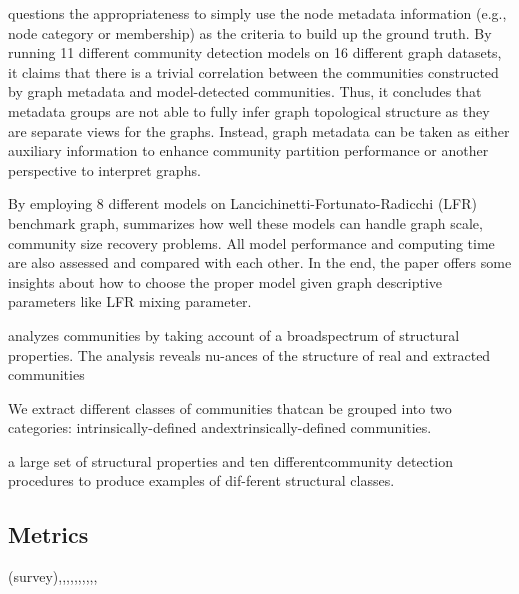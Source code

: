 \cite{hric2014community} questions the  appropriateness to simply use the node metadata information (e.g., node category or membership) as the criteria to build up the ground truth. By running 11 different community detection models on 16 different graph datasets, it claims that there is a trivial correlation between the communities constructed by graph metadata and model-detected communities. Thus, it concludes that metadata groups are not able to fully infer graph topological structure as they are separate views for the graphs. Instead, graph metadata can be taken as either auxiliary information to enhance community partition performance or another perspective to interpret graphs.  

By employing 8 different models on Lancichinetti-Fortunato-Radicchi (LFR) benchmark graph, \cite{yang2016comparative} summarizes how well these models can handle graph scale, community size recovery problems. All model performance and computing time are also assessed and compared with each other. In the end, the paper offers some insights about how to choose the proper model given graph descriptive parameters like LFR mixing parameter.

\cite{abrahao2012separability} analyzes communities by taking account of a broadspectrum of structural properties. The analysis reveals nu-ances of the structure of real and extracted communities

We extract diﬀerent classes of communities thatcan be grouped into two categories: intrinsically-deﬁned andextrinsically-deﬁned communities.

a large set of structural properties and ten diﬀerentcommunity detection procedures to produce examples of dif-ferent structural classes.


\cite{wang2015community}
\subsection{Metrics} 
\cite{chakraborty2017metrics}(survey),\cite{murray2012using},\cite{chakraborty2014permanence},\cite{li2015measuring},\cite{shen2010spectral},\cite{aldecoa2013surprise},\cite{hu2010measuring},\cite{aldecoa2012closed},\cite{zhang2015evaluating},\cite{nikolaev2015efficient},




